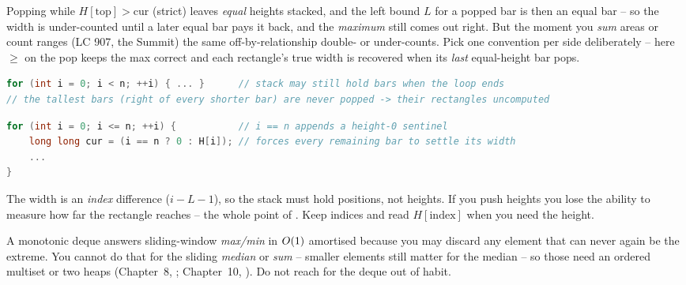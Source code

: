 \begin{warningbox}
Popping while $H[\text{top}] > \text{cur}$ (strict) leaves \emph{equal} heights stacked, and the left
bound $L$ for a popped bar is then an equal bar -- so the width is under-counted until a later equal bar
pays it back, and the \emph{maximum} still comes out right. But the moment you \emph{sum} areas or count
ranges (LC 907, the Summit) the same off-by-relationship double- or under-counts. Pick one convention per
side deliberately -- here $\ge$ on the pop keeps the max correct and each rectangle's true width is
recovered when its \emph{last} equal-height bar pops.
\end{warningbox}
\begin{lstlisting}[caption={\textcolor{warningred}{WRONG}: no sentinel -- tall bars never get their right bound}, language=C++, basicstyle=\ttfamily\small]
for (int i = 0; i < n; ++i) { ... }      // stack may still hold bars when the loop ends
// the tallest bars (right of every shorter bar) are never popped -> their rectangles uncomputed
\end{lstlisting}
\begin{lstlisting}[caption={\textcolor{successgreen}{RIGHT}: run to i==n with cur==0 to flush the stack}, language=C++, basicstyle=\ttfamily\small]
for (int i = 0; i <= n; ++i) {           // i == n appends a height-0 sentinel
    long long cur = (i == n ? 0 : H[i]); // forces every remaining bar to settle its width
    ...
}
\end{lstlisting}

\begin{warningbox}
The width is an \emph{index} difference ($i - L - 1$), so the stack must hold positions, not heights. If
you push heights you lose the ability to measure how far the rectangle reaches -- the whole point of
. Keep indices and read $H[\text{index}]$ when you need the height.
\end{warningbox}

\begin{warningbox}
A monotonic deque answers sliding-window \emph{max/min} in $O(1)$ amortised because you may discard
any element that can never again be the extreme. You cannot do that for the sliding \emph{median} or
\emph{sum} -- smaller elements still matter for the median -- so those need an ordered multiset or two
heaps (Chapter~8, ; Chapter~10, ). Do not reach for the deque out of habit.
\end{warningbox}

